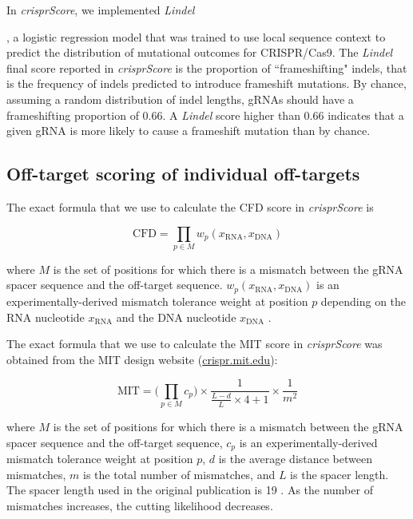 \documentclass[pdftex,english,10pt]{article}
\begin{document}
In \textit{crisprScore}, we implemented \textit{Lindel} {\citep{lindel}, a logistic regression model that was trained to use local sequence context to predict the distribution of mutational outcomes for CRISPR/Cas9. The \textit{Lindel} final score reported in \textit{crisprScore} is the proportion of ``frameshifting" indels, that is the frequency of indels predicted to introduce frameshift mutations. By chance, assuming a random distribution of indel lengths, gRNAs should have a frameshifting proportion of 0.66. A \textit{Lindel} score higher than 0.66 indicates that a given gRNA is more likely to cause a frameshift mutation than by chance. 




\subsection*{Off-target scoring of individual off-targets}

The exact formula that we use to calculate the CFD score in \textit{crisprScore} is

\begin{equation}
\text{CFD} = \prod_{p \in M}{w_p}(x_{\text{RNA}},x_\text{DNA})
\end{equation}

where $M$ is the set of positions for which there is a mismatch between the gRNA spacer sequence and the off-target sequence.
$w_p(x_{\text{RNA}},x_\text{DNA})$ is an experimentally-derived mismatch tolerance weight at position $p$ depending on the RNA nucleotide $x_{\text{RNA}}$ and the DNA nucleotide $x_{\text{DNA}}$ \citep{doench2016optimized}. 


The exact formula that we use to calculate the MIT score in \textit{crisprScore} was obtained from the MIT design website (\url{crispr.mit.edu}):



\begin{equation}
\text{MIT} = \biggl(\prod_{p \in M}{c_p}\biggr)\times\frac{1}{\frac{L-d}{L}\times4+1}\times\frac{1}{m^2}
\end{equation}

where $M$ is the set of positions for which there is a mismatch between the gRNA spacer sequence and the off-target sequence, $c_p$ is an experimentally-derived mismatch tolerance weight at position $p$, $d$ is the average distance between mismatches, $m$ is the total number of mismatches, and $L$ is the spacer length.  The spacer length used in the original publication is 19 \citep{mit}. As the number of mismatches increases, the cutting likelihood decreases. 

}
\end{document}
